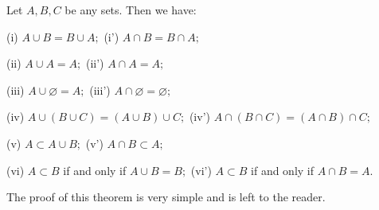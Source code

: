 Let $A, B, C$ be any sets. Then we have:

(i) $A \cup B = B \cup A;$ (i') $A \cap B = B \cap A;$

(ii) $A \cup A = A;$ (ii') $A \cap A = A;$

(iii) $A \cup \varnothing = A;$ (iii') $A \cap \varnothing = \varnothing;$

(iv) $A \cup (B \cup C) = (A \cup B) \cup C;$ (iv') $A \cap (B \cap C) = (A \cap B) \cap C;$

(v) $A \subset A \cup B;$ (v') $A \cap B \subset A;$

(vi) $A \subset B$ if and only if $A \cup B = B;$ (vi') $A \subset B$ if and only if $A \cap B = A.$

The proof of this theorem is very simple and is left to the reader.